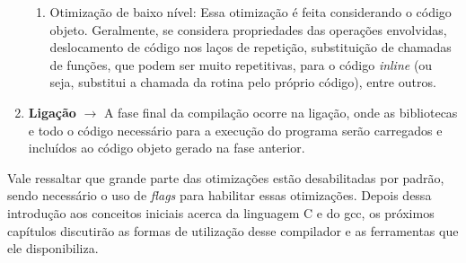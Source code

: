\begin{enumerate}
    \begin{enumerate}
        \item Otimização de baixo nível: Essa otimização é feita considerando o código objeto. Geralmente, se considera propriedades das operações envolvidas, deslocamento de código nos laços de repetição, substituição de chamadas de funções, que podem ser muito repetitivas, para o código \textit{inline} (ou seja, substitui a chamada da rotina pelo próprio código), entre outros.
    \end{enumerate}
    \item \textbf{Ligação} $\rightarrow$ A fase final da compilação ocorre na ligação, onde as bibliotecas e todo o código necessário para a execução do programa serão carregados e incluídos ao código objeto gerado na fase anterior.
\end{enumerate}

Vale ressaltar que grande parte das otimizações estão desabilitadas por padrão, sendo necessário o uso de \textit{flags} para habilitar essas otimizações. Depois dessa introdução aos conceitos iniciais acerca da linguagem C e do gcc, os próximos capítulos discutirão as formas de utilização desse compilador e as ferramentas que ele disponibiliza.
